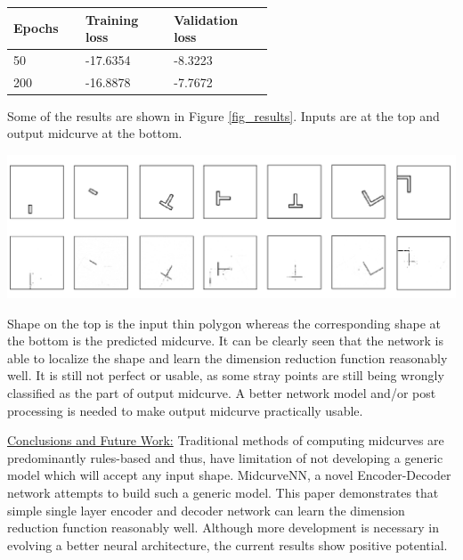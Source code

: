 \documentclass{article}
\begin{document}
\begin{table}
\centering

\begin{tabular}[htbp]{@{} p{0.14\linewidth}  p{0.22\linewidth}  p{0.22\linewidth}  @{}} \toprule
{\bf Epochs } & {\bf Training loss }  & {\bf Validation loss} \\
\midrule
50	& -17.6354	& -8.3223\\
200	& -16.8878	& -7.7672 \\
\bottomrule
\end{tabular}
\label{tbl_loss}
\end{table}


Some of the results are shown in Figure \ref{fig_results}. Inputs are at the top and output midcurve at the bottom.

     \begin{center}
	\includegraphics[width=\linewidth]{images/midcurvenn_results}
	\label{fig_results}
    \end{center}

Shape on the top is the input thin polygon whereas the corresponding shape at the bottom is the predicted midcurve. It can be clearly seen that the network is able to localize the shape and learn the dimension reduction function reasonably well. It is still not perfect or usable, as some stray points are still being wrongly classified as the part of output midcurve. A better network model and/or post processing is needed to make output midcurve practically usable.


\vspace{1em}
\noindent\underline{Conclusions and Future Work:}\vspace{0.2em}\newline
Traditional methods of computing midcurves are predominantly rules-based and thus, have limitation of not developing a generic model which will accept any input shape. MidcurveNN, a novel Encoder-Decoder network attempts to build such a generic model. This paper demonstrates that simple single layer encoder and decoder network can learn the dimension reduction function reasonably well. Although more development is necessary in evolving a better neural architecture, the current results show positive potential. 
\end{document}
